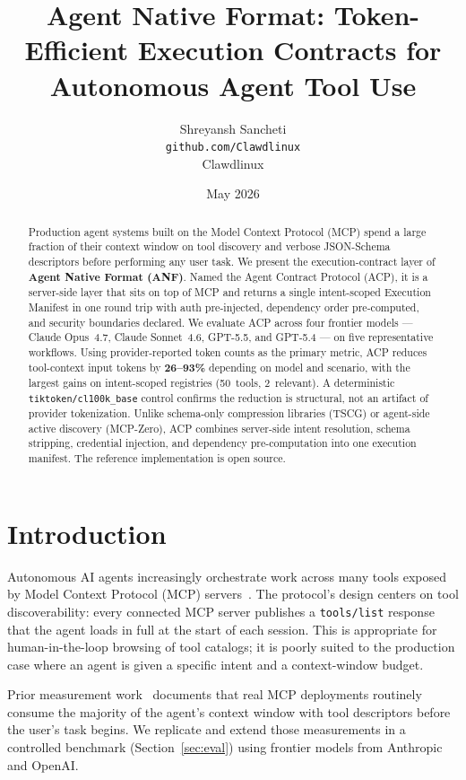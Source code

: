 \documentclass[11pt,a4paper]{article}
\title{Agent Native Format: Token-Efficient Execution Contracts for Autonomous Agent Tool Use}
\author{Shreyansh Sancheti\\
        \texttt{github.com/Clawdlinux}\\
        Clawdlinux}
\date{May 2026}
\begin{document}
\maketitle

\begin{abstract}
Production agent systems built on the Model Context Protocol (MCP) spend a
large fraction of their context window on tool discovery and verbose
JSON-Schema descriptors before performing any user task. We present the
execution-contract layer of \textbf{Agent Native Format (ANF)}. Named the
Agent Contract Protocol (ACP), it is a server-side layer that sits on top
of MCP and returns a single intent-scoped Execution Manifest in one round
trip with auth pre-injected, dependency order pre-computed, and security
boundaries declared. We evaluate ACP across four frontier models --- Claude
Opus~4.7, Claude Sonnet~4.6, GPT-5.5, and GPT-5.4 --- on five representative
workflows. Using provider-reported token counts as the primary metric, ACP
reduces tool-context input tokens by \textbf{26--93\%} depending on model and
scenario, with the largest gains on intent-scoped registries (50~tools,
2~relevant). A deterministic \texttt{tiktoken/cl100k\_base} control confirms
the reduction is structural, not an artifact of provider tokenization. Unlike
schema-only compression libraries (TSCG) or agent-side active discovery
(MCP-Zero), ACP combines server-side intent resolution, schema stripping,
credential injection, and dependency pre-computation into one execution
manifest. The reference implementation is open source.
\end{abstract}

\section{Introduction}

Autonomous AI agents increasingly orchestrate work across many tools exposed
by Model Context Protocol (MCP) servers~\cite{mcp}. The protocol's design
centers on tool discoverability: every connected MCP server publishes a
\texttt{tools/list} response that the agent loads in full at the start of
each session. This is appropriate for human-in-the-loop browsing of tool
catalogs; it is poorly suited to the production case where an agent is
given a specific intent and a context-window budget.

Prior measurement work~\cite{eckstein2025,apideck2025,scalekit2026} documents
that real MCP deployments routinely consume the majority of the agent's
context window with tool descriptors before the user's task begins. We
replicate and extend those measurements in a controlled benchmark
(Section~\ref{sec:eval}) using frontier models from Anthropic and OpenAI.
\end{document}
